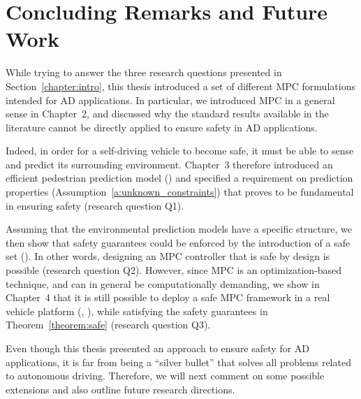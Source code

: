 \chapter{Concluding Remarks and Future Work}
\label{sec:conclusion}
%

While trying to answer the three research questions presented in Section~\ref{chapter:intro}, this thesis introduced a set of different MPC formulations intended for AD applications. In particular, we introduced MPC in a general sense in Chapter~2, and discussed why the standard results available in the literature cannot be directly applied to ensure safety in AD applications.  

Indeed, in order for a self-driving vehicle to become safe, it must be able to sense and predict its surrounding environment. Chapter~3 therefore introduced an efficient pedestrian prediction model (\paperPedestrian{}) and specified a requirement on prediction properties (Assumption~\ref{a:unknown_constraints}) that proves to be fundamental in ensuring safety (research question Q1).

Assuming that the environmental prediction models have a specific structure, we then show that safety guarantees could be enforced by the introduction of a safe set (\paperSafe). In other words, designing an MPC controller that is safe by design is possible (research question Q2). However, since MPC is an optimization-based technique, and can in general be computationally demanding, we show in Chapter~4 that it is still possible to deploy a safe MPC framework in a real vehicle platform (\paperPlanner, \paperExp), while satisfying the safety guarantees in Theorem~\ref{theorem:safe} (research question Q3).


Even though this thesis presented an approach to ensure safety for AD applications, it is far from being a ``silver bullet'' that solves all problems related to autonomous driving. Therefore, we will next comment on some possible extensions and also outline future research directions.



